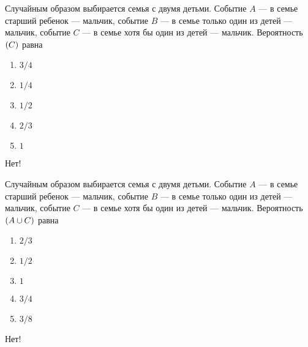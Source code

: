 \documentclass[t]{beamer}
\let\P\relax
\DeclareMathOperator{\P}{\mathbb{P}}
\begin{document}
 \begin{frame} \label{1-No} 
\begin{block}{1} 

Случайным образом выбирается семья с двумя детьми. Событие $A$ — в семье старший ребенок — мальчик,  событие $B$ — в семье только один из детей — мальчик, событие $C$ — в семье хотя бы один из детей — мальчик.  Вероятность $\P(C)$ равна
 


 \end{block} 
\begin{enumerate} 
\item[] \hyperlink{1-Yes}{\beamergotobutton{} $3/4$}
\item[] \hyperlink{1-No}{\beamergotobutton{} $1/4$}
\item[] \hyperlink{1-No}{\beamergotobutton{} $1/2$}
\item[] \hyperlink{1-No}{\beamergotobutton{} $2/3$
}
\item[] \hyperlink{1-No}{\beamergotobutton{} $1$}
\end{enumerate} 

 \alert{Нет!} 
\end{frame} 


 \begin{frame} \label{2-No} 
\begin{block}{2} 

Случайным образом выбирается семья с двумя детьми. Событие $A$ — в семье старший ребенок — мальчик,  событие $B$ — в семье только один из детей — мальчик, событие $C$ — в семье хотя бы один из детей — мальчик.  Вероятность $\P(A \cup C)$ равна
    


 \end{block} 
\begin{enumerate} 
\item[] \hyperlink{2-No}{\beamergotobutton{} $2/3$}
\item[] \hyperlink{2-No}{\beamergotobutton{} $1/2$
}
\item[] \hyperlink{2-No}{\beamergotobutton{} $1$}
\item[] \hyperlink{2-Yes}{\beamergotobutton{} $3/4$}
\item[] \hyperlink{2-No}{\beamergotobutton{} $3/8$}
\end{enumerate} 

 \alert{Нет!} 
\end{frame} 
\end{document}
